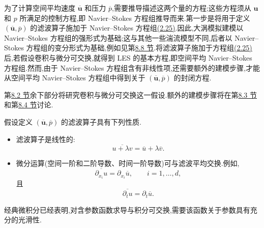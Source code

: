 \begin{note}[推导大涡模拟模型的步骤]
\label{note:steps-deriving-les-models}
为了计算空间平均速度 $\overline{\bm{u}}$ 和压力 $\overline{p}$,需要推导描述这两个量的方程;这些方程须从 $\bm{u}$ 和 $p$ 所满足的控制方程,即 Navier--Stokes 方程组推导而来.第一步是将用于定义 $(\overline{\bm{u}},\overline{p})$ 的滤波算子施加于 Navier--Stokes 方程组\hyperref[eq:incompressible-navier-stokes]{(2.25)}.因此,大涡模拟建模以 Navier--Stokes 方程组的强形式为基础;这与其他一些湍流模型不同,后者以 Navier--Stokes 方程组的变分形式为基础,例如见第\hyperref[sec:variational-multiscale-methods]{8.8 节}.将滤波算子施加于方程组\hyperref[eq:incompressible-navier-stokes]{(2.25)}后,若假设卷积与微分可交换,就得到 LES 的基本方程,即空间平均 Navier--Stokes 方程组.然而,由于 Navier--Stokes 方程组含有非线性项,还需要额外的建模步骤,才能从空间平均 Navier--Stokes 方程组中得到关于 $(\overline{\bm{u}},\overline{p})$ 的封闭方程.

第\hyperref[sec:large-eddy-space-averaging]{8.2 节}余下部分将研究卷积与微分可交换这一假设.额外的建模步骤将在第\hyperref[sec:les-models]{8.3 节}和第\hyperref[sec:les-wave-number-models]{8.4 节}讨论.
\end{note}

\begin{note}[滤波算子的假设]
\label{note:assumptions-filter-operator}
假设定义 $(\overline{\bm{u}},\overline{p})$ 的滤波算子具有下列性质.
\begin{itemize}
 \item 滤波算子是线性的:
 \begin{equation}\label{eq:filter-linearity}
  \overline{u+\lambda v}=\overline{u}+\lambda\overline{v}.
 \end{equation}
 \item 微分运算(空间一阶和二阶导数、时间一阶导数)可与滤波平均交换.例如,
 \begin{equation}\label{eq:filter-commutation-space-derivative}
  \overline{\partial_{x_i}u}
   =\partial_{x_i}\overline{u},
  \qquad i=1,\ldots,d,
 \end{equation}
 且
 \begin{equation}\label{eq:filter-commutation-time-derivative}
  \overline{\partial_t u}=\partial_t\overline{u}.
 \end{equation}
\end{itemize}
经典微积分已经表明,对含参数函数求导与积分可交换,需要该函数关于参数具有充分的光滑性.
\end{note}

